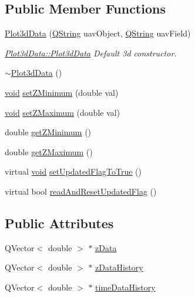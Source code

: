 \subsection*{\-Public \-Member \-Functions}
\begin{DoxyCompactItemize}
\item 
\hyperlink{group___scope_plugin_ga1f2325d51b8163d0c535e07fda3ff043}{\-Plot3d\-Data} (\hyperlink{group___u_a_v_objects_plugin_gab9d252f49c333c94a72f97ce3105a32d}{\-Q\-String} uav\-Object, \hyperlink{group___u_a_v_objects_plugin_gab9d252f49c333c94a72f97ce3105a32d}{\-Q\-String} uav\-Field)
\begin{DoxyCompactList}\small\item\em \hyperlink{group___scope_plugin_ga1f2325d51b8163d0c535e07fda3ff043}{\-Plot3d\-Data\-::\-Plot3d\-Data} \-Default 3d constructor. \end{DoxyCompactList}\item 
\hyperlink{group___scope_plugin_gaba0a6fcc762d6818f231df0e8a975089}{$\sim$\-Plot3d\-Data} ()
\item 
\hyperlink{group___u_a_v_objects_plugin_ga444cf2ff3f0ecbe028adce838d373f5c}{void} \hyperlink{group___scope_plugin_gaa8457325b9ed2d7199e882002d9cb64f}{set\-Z\-Minimum} (double val)
\item 
\hyperlink{group___u_a_v_objects_plugin_ga444cf2ff3f0ecbe028adce838d373f5c}{void} \hyperlink{group___scope_plugin_gad2d6739b5faacba8f73c88fbc9b6592d}{set\-Z\-Maximum} (double val)
\item 
double \hyperlink{group___scope_plugin_ga1b7cd5b46f3d8a13bcdba217cc7fe392}{get\-Z\-Minimum} ()
\item 
double \hyperlink{group___scope_plugin_ga9d0722b373e8cf2ea23d29cc8717f8ef}{get\-Z\-Maximum} ()
\item 
virtual \hyperlink{group___u_a_v_objects_plugin_ga444cf2ff3f0ecbe028adce838d373f5c}{void} \hyperlink{group___scope_plugin_ga08cc07e86d20dc6dad41488e34bb196c}{set\-Updated\-Flag\-To\-True} ()
\item 
virtual bool \hyperlink{group___scope_plugin_ga3d0789d96a38bc51e7e1be13754ba43e}{read\-And\-Reset\-Updated\-Flag} ()
\end{DoxyCompactItemize}
\subsection*{\-Public \-Attributes}
\begin{DoxyCompactItemize}
\item 
\-Q\-Vector$<$ double $>$ $\ast$ \hyperlink{group___scope_plugin_gad5607d9145f51871817c4094cd1ba250}{z\-Data}
\item 
\-Q\-Vector$<$ double $>$ $\ast$ \hyperlink{group___scope_plugin_gab1e0ead20c4c64f78a8dafc2ae101710}{z\-Data\-History}
\item 
\-Q\-Vector$<$ double $>$ $\ast$ \hyperlink{group___scope_plugin_ga92914eba20188371aeb3ad365c01acc4}{time\-Data\-History}
\end{DoxyCompactItemize}
